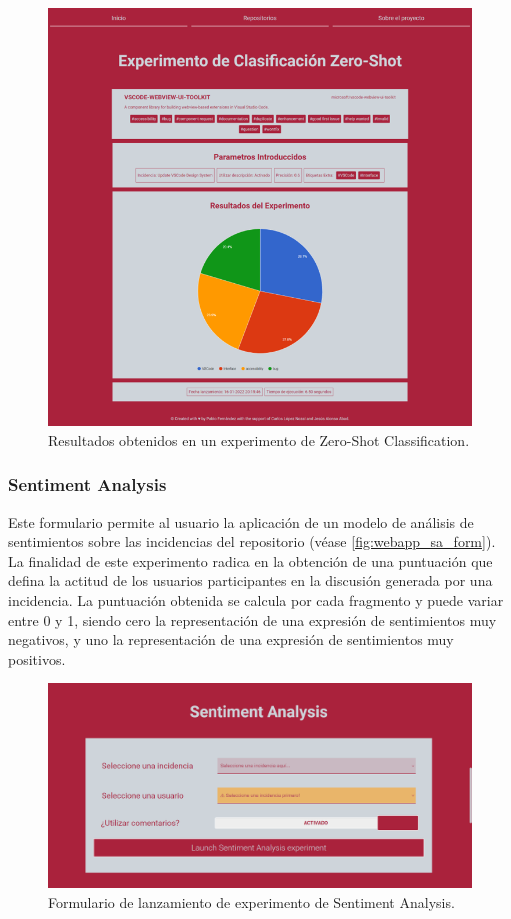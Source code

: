 \begin{figure}[!ht]
	\centering
    \includegraphics[width=\textwidth]{img/webapp_zsc_output.png}
	\caption{Resultados obtenidos en un experimento de Zero-Shot Classification.}
	\label{fig:webapp_zsc_output}
\end{figure}

\subsubsection{Sentiment Analysis}

Este formulario permite al usuario la aplicación de un modelo de análisis de sentimientos sobre las incidencias del repositorio (véase \autoref{fig:webapp_sa_form}). La finalidad de este experimento radica en la obtención de una puntuación que defina la actitud de los usuarios participantes en la discusión generada por una incidencia. La puntuación obtenida se calcula por cada fragmento y puede variar entre 0 y 1, siendo cero la representación de una expresión de sentimientos muy negativos, y uno la representación de una expresión de sentimientos muy positivos. 

\begin{figure}[!ht]
	\centering
    \includegraphics[width=\textwidth]{img/webapp_sa_form.png}
	\caption{Formulario de lanzamiento de experimento de Sentiment Analysis.}
	\label{fig:webapp_sa_form}
\end{figure}

